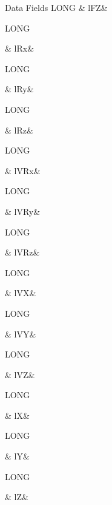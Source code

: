 \begin{DoxyFields}{Data Fields}
\hypertarget{a00003_ad3033b18f8c66ccaf31fa27a6d6cca3e}{L\-O\-N\-G}\label{a00003_ad3033b18f8c66ccaf31fa27a6d6cca3e}
&
l\-F\-Z&
\\
\hline

\hypertarget{a00003_ae787bcbafe0c743edb3cc7908a9ec614}{L\-O\-N\-G}\label{a00003_ae787bcbafe0c743edb3cc7908a9ec614}
&
l\-Rx&
\\
\hline

\hypertarget{a00003_a224cc5c8c3276d717e40adb86bca63af}{L\-O\-N\-G}\label{a00003_a224cc5c8c3276d717e40adb86bca63af}
&
l\-Ry&
\\
\hline

\hypertarget{a00003_af3ec962f9ea47f6a29972d2991c971d7}{L\-O\-N\-G}\label{a00003_af3ec962f9ea47f6a29972d2991c971d7}
&
l\-Rz&
\\
\hline

\hypertarget{a00003_a2b5e8522323e8dac798ca548f055f8bd}{L\-O\-N\-G}\label{a00003_a2b5e8522323e8dac798ca548f055f8bd}
&
l\-V\-Rx&
\\
\hline

\hypertarget{a00003_a74b58b91e1d6808316dd8a60ae57cbca}{L\-O\-N\-G}\label{a00003_a74b58b91e1d6808316dd8a60ae57cbca}
&
l\-V\-Ry&
\\
\hline

\hypertarget{a00003_ae4c41cb011e9a243a50954ed8ea9fa04}{L\-O\-N\-G}\label{a00003_ae4c41cb011e9a243a50954ed8ea9fa04}
&
l\-V\-Rz&
\\
\hline

\hypertarget{a00003_aadcdcdc65ce7b2b05875413b9862460c}{L\-O\-N\-G}\label{a00003_aadcdcdc65ce7b2b05875413b9862460c}
&
l\-V\-X&
\\
\hline

\hypertarget{a00003_a779ed3695f55672305134072192a8c6e}{L\-O\-N\-G}\label{a00003_a779ed3695f55672305134072192a8c6e}
&
l\-V\-Y&
\\
\hline

\hypertarget{a00003_a0f245ad715d328a60d1a33244f98afa8}{L\-O\-N\-G}\label{a00003_a0f245ad715d328a60d1a33244f98afa8}
&
l\-V\-Z&
\\
\hline

\hypertarget{a00003_a5caab2f62348491c05eb56720be4ed99}{L\-O\-N\-G}\label{a00003_a5caab2f62348491c05eb56720be4ed99}
&
l\-X&
\\
\hline

\hypertarget{a00003_ae174db734839eb185acdb0cd79b9ba24}{L\-O\-N\-G}\label{a00003_ae174db734839eb185acdb0cd79b9ba24}
&
l\-Y&
\\
\hline

\hypertarget{a00003_a7dd7142cab803f67cdcda10d1eb720fd}{L\-O\-N\-G}\label{a00003_a7dd7142cab803f67cdcda10d1eb720fd}
&
l\-Z&
\\
\hline


\end{DoxyFields}
